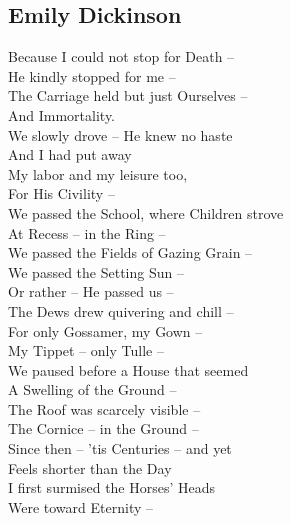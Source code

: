 \documentclass[a4,12pt]{article}
\begin{document}
\begin{center}
        \subsection*{Emily Dickinson}

        \vspace{15pt}
        Because I could not stop for Death –\\
        He kindly stopped for me –\\
        The Carriage held but just Ourselves –\\
        And Immortality.\\

        \vspace{15pt}
        We slowly drove – He knew no haste\\
        And I had put away\\
        My labor and my leisure too,\\
        For His Civility –\\

        \vspace{15pt}
        We passed the School, where Children strove\\
        At Recess – in the Ring –\\
        We passed the Fields of Gazing Grain –\\
        We passed the Setting Sun –\\

        \vspace{15pt}
        Or rather – He passed us –\\
        The Dews drew quivering and chill –\\
        For only Gossamer, my Gown –\\
        My Tippet – only Tulle –\\

        \vspace{15pt}
        We paused before a House that seemed\\
        A Swelling of the Ground –\\
        The Roof was scarcely visible –\\
        The Cornice – in the Ground –\\

        \vspace{15pt}
        Since then – 'tis Centuries – and yet\\
        Feels shorter than the Day\\
        I first surmised the Horses' Heads\\
        Were toward Eternity –\\

 

    \end{center}
\end{document}
